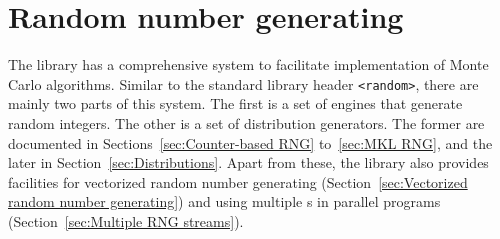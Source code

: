 %
%
%
%

\chapter{Random number generating}
\label{chap:Random number generating}

The library has a comprehensive \rng system to facilitate implementation of
Monte Carlo algorithms. Similar to the standard library header \verb|<random>|,
there are mainly two parts of this system. The first is a set of \rng{} engines
that generate random integers. The other is a set of distribution generators.
The former are documented in Sections~\ref{sec:Counter-based RNG}
to~\ref{sec:MKL RNG}, and the later in Section~\ref{sec:Distributions}. Apart
from these, the library also provides facilities for vectorized random number
generating (Section~\ref{sec:Vectorized random number generating}) and using
multiple \rng{}s in parallel programs (Section~\ref{sec:Multiple RNG streams}).

